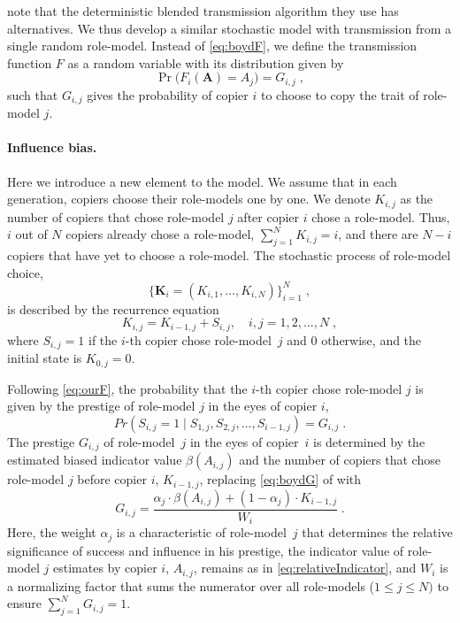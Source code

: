 \documentclass[12pt]{extarticle}
\let\vec\mathbf
\begin{document}
\citet{evolutionBook} note that the deterministic blended transmission algorithm they use has alternatives. We thus develop a similar stochastic model with transmission from a single random role-model. Instead of \cref{eq:boydF}, we define the transmission function $F$ as a random variable with its distribution given by 
\begin{equation}\label{eq:ourF}
\Pr\big(F_i(\vec{A}) = A_{j}\big) = G_{i,j} \;,
\end{equation}
such that $G_{i,j}$ gives the probability of copier $i$ to choose to copy the trait of role-model $j$.

\paragraph{Influence bias.}
Here we introduce a new element to the model.
We assume that in each generation, copiers choose their role-models one by one.
We denote $K_{i,j}$ as the number of copiers that chose role-model $j$ after copier $i$ chose a role-model. Thus, $i$ out of $N$ copiers already chose a role-model, $\sum_{j=1}^N{K_{i,j}} = i$, and there are $N-i$ copiers that have yet to choose a role-model.
The stochastic process of role-model choice, 
\begin{equation} \label{eq:process}
\big\{\vec{K}_i = (K_{i,1}, \ldots, K_{i,N}) \big\}_{i=1}^N \;,
\end{equation}
is described by the recurrence equation
\begin{equation} \label{eq:recurrence}
K_{i,j} = K_{i-1,j} + S_{i,j}, \quad i,j=1,2,\ldots,N \;,
\end{equation}
where $S_{i,j}=1$ if the $i$-th copier chose role-model~$j$ and 0 otherwise, and the initial state is $K_{0,j}=0$.

Following \cref{eq:ourF}, the probability that the $i$-th copier chose role-model $j$ is given by the prestige of role-model $j$ in the eyes of copier $i$,
\begin{equation}\label{eq:recPrestige}
Pr(S_{i,j}=1 \mid S_{1,j},S_{2,j},...,S_{i-1,j}) = G_{i,j} \;.
\end{equation}
The prestige $G_{i,j}$ of role-model~$j$ in the eyes of copier~$i$ is determined by the estimated biased indicator value $\beta(A_{i,j})$ and the number of copiers that chose role-model $j$ before copier $i$, $K_{i-1,j}$, replacing \cref{eq:boydG} of \citet{evolutionBook} with
\begin{equation}\label{eq:prestige}
G_{i,j} = \frac{\alpha_j \cdot \beta(A_{i,j}) + (1-\alpha_j) \cdot K_{i-1,j}}{W_i} \;.
\end{equation}
Here, the weight $\alpha_j$ is a characteristic of role-model~$j$ that determines the relative significance of success and influence in his prestige, the indicator value of role-model $j$ estimates by copier $i$, $A_{i,j}$, remains as in \cref{eq:relativeIndicator}, and $W_i$ is a normalizing factor that sums the numerator over all role-models ($1\le j \le N)$ to ensure $\sum_{j=1}^{N}{G_{i,j}}=1$.
\end{document}
